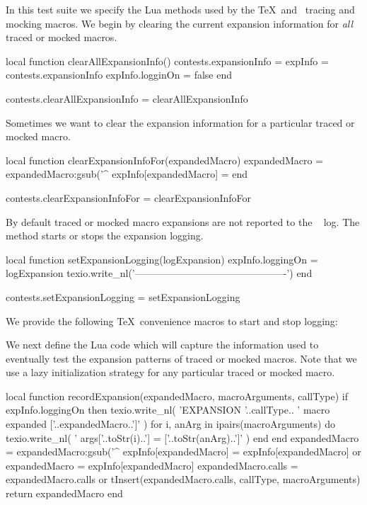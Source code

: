 
In this test suite we specify the Lua methods used by the \TeX\ and 
\ConTeXt\ tracing and mocking macros. We begin by clearing the current 
expansion information for \emph{all} traced or mocked macros. 

\startLuaCode
local function clearAllExpansionInfo()
  contests.expansionInfo = { }
  expInfo                = contests.expansionInfo
  expInfo.logginOn       = false
end

contests.clearAllExpansionInfo = clearAllExpansionInfo
\stopLuaCode

Sometimes we want to clear the expansion information for a particular 
traced or mocked macro. 

\startLuaCode
local function clearExpansionInfoFor(expandedMacro)
  expandedMacro = expandedMacro:gsub('^%
  expInfo[expandedMacro] = { }
end

contests.clearExpansionInfoFor = clearExpansionInfoFor
\stopLuaCode

By default traced or mocked macro expansions are not reported to the 
\LuaTeX\  log. The  method starts or 
stops the expansion logging. 

\startLuaCode
local function setExpansionLogging(logExpansion)
  expInfo.loggingOn = logExpansion
  texio.write_nl('----------------------------------------------')
end

contests.setExpansionLogging = setExpansionLogging
\stopLuaCode

We provide the following \TeX\ convenience macros to start and stop 
logging: 

\startMkIVCode
\def\startLoggingExpansions{%
  \directlua{thirddata.contests.setExpansionLogging(true)}
}
\def\stopLoggingExpansions{%
  \directlua{thirddata.contests.setExpansionLogging(false)}
}
\stopMkIVCode

We next define the Lua code which will capture the information used to 
eventually test the expansion patterns of traced or mocked macros. Note 
that we use a lazy initialization strategy for any particular traced or 
mocked macro. 

\startLuaCode
local function recordExpansion(expandedMacro,
                               macroArguments,
                               callType)
  if expInfo.loggingOn then
    texio.write_nl(
      'EXPANSION '..callType..
      ' macro expanded ['..expandedMacro..']'
    )
    for i, anArg in ipairs(macroArguments) do
      texio.write_nl(
        '  args['..toStr(i)..'] = ['..toStr(anArg)..']'
      )
    end
  end
  expandedMacro = expandedMacro:gsub('^%
  expInfo[expandedMacro] = expInfo[expandedMacro] or { }
  expandedMacro          = expInfo[expandedMacro]
  expandedMacro.calls    = expandedMacro.calls or { }
  tInsert(expandedMacro.calls, { callType, macroArguments})
  return expandedMacro
end

